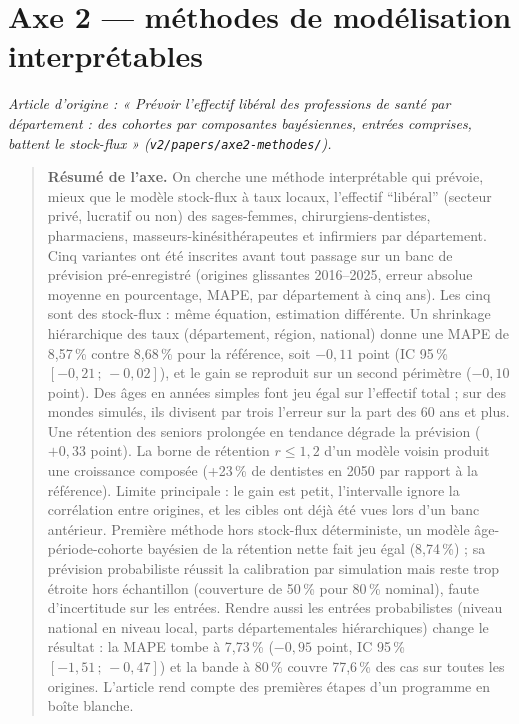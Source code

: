 \part{Axe 2 --- méthodes de modélisation interprétables}
\noindent\textit{Article d'origine : « Prévoir l'effectif libéral des professions de santé par département : des cohortes par composantes bayésiennes, entrées comprises, battent le stock-flux » (\texttt{v2/papers/axe2-methodes/}).}

\begin{quote}\small\textbf{Résumé de l'axe.} On cherche une méthode interprétable qui prévoie, mieux que le modèle stock-flux à taux locaux,
l'effectif \enquote{libéral} (secteur privé, lucratif ou non) des sages-femmes, chirurgiens-dentistes,
pharmaciens, masseurs-kinésithérapeutes et infirmiers par département. Cinq variantes ont été
inscrites avant tout passage sur un banc de prévision pré-enregistré (origines glissantes 2016--2025,
erreur absolue moyenne en pourcentage, MAPE, par département à cinq ans). Les cinq sont des stock-flux :
même équation, estimation différente. Un shrinkage hiérarchique des taux (département, région,
national) donne une MAPE de 8,57\,\%\mesure{} contre 8,68\,\%\mesure{} pour la référence, soit
$-0{,}11$\mesure{} point (IC 95\,\% $[-0{,}21\,;\,-0{,}02]$\mesure), et le gain se reproduit sur un second
périmètre ($-0{,}10$\mesure{} point). Des âges en années simples font jeu égal sur l'effectif total ;
sur des mondes simulés, ils divisent par trois\mesure{} l'erreur sur la part des 60 ans et plus. Une
rétention des seniors prolongée en tendance dégrade la prévision ($+0{,}33$\mesure{} point). La borne de
rétention $r \le 1{,}2$ d'un modèle voisin produit une croissance composée (+23\,\%\mesure{} de dentistes
en 2050 par rapport à la référence). Limite principale : le gain est petit, l'intervalle ignore la
corrélation entre origines, et les cibles ont déjà été vues lors d'un banc antérieur. Première méthode hors stock-flux déterministe, un modèle âge-période-cohorte bayésien de la rétention
nette fait jeu égal (8,74\,\%\mesure) ; sa prévision probabiliste réussit la calibration par
simulation mais reste trop étroite hors échantillon (couverture de 50\,\%\mesure{} pour 80\,\% nominal),
faute d'incertitude sur les entrées. Rendre aussi les entrées probabilistes (niveau national
en niveau local, parts départementales hiérarchiques) change le résultat : la MAPE tombe à
7,73\,\%\mesure{} ($-0{,}95$\mesure{} point, IC 95\,\% $[-1{,}51\,;\,-0{,}47]$\mesure) et la bande à 80\,\%
couvre 77,6\,\%\mesure{} des cas sur toutes les origines. L'article rend compte des premières étapes
d'un programme en boîte blanche.\end{quote}

